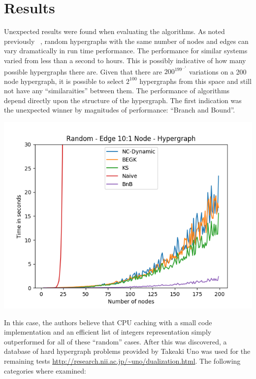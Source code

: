 \section{Results}
Unexpected results were found when evaluating the algorithms. As noted previously ~\cite{khachiyan2006efficient}, random hypergraphs with the same number of nodes and edges can vary dramatically in run time performance. The performance for similar systems varied from less than a second to hours. This is possibly indicative of how many possible hypergraphs there are. Given that there are ${200}^{{199}^{{...}^{1}}}$ variations on a 200 node hypergraph, it is possible to select $2^{100}$ hypergraphs from this space and still not have any ``similaraities'' between them. The performance of algorithms depend directly upon the structure of the hypergraph. The first indication was the unexpected winner by magnitudes of performance: ``Branch and Bound''. \\
\begin{center}
\includegraphics[scale=.50]{Solvers.png}
\end{center}

In this case, the authors believe that CPU caching with a small code implementation and an efficient list of integers representation simply outperformed for all of these ``random'' cases. After this was discovered, a database of hard hypergraph problems provided by Takeaki Uno was used for the remaining tests \url{http://research.nii.ac.jp/~uno/dualization.html}. The following categories where examined:

